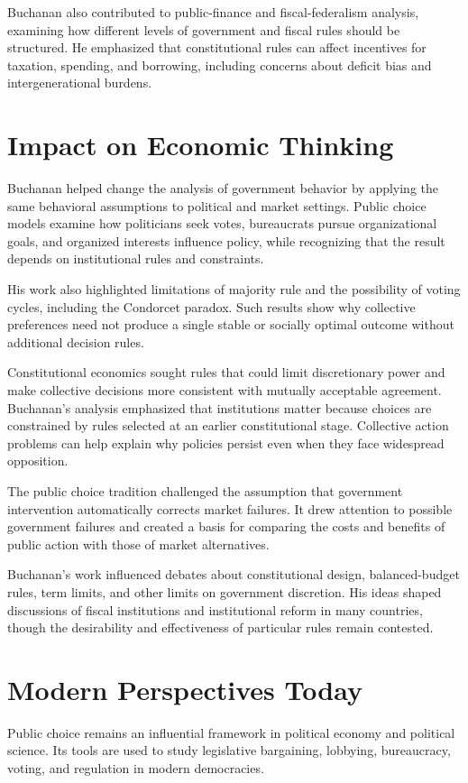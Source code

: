 Buchanan also contributed to public-finance and fiscal-federalism analysis,
examining how different levels of government and fiscal rules should be
structured. He emphasized that constitutional rules can affect incentives for
taxation, spending, and borrowing, including concerns about deficit bias and
intergenerational burdens.

\section{Impact on Economic Thinking}
Buchanan helped change the analysis of government behavior by applying the
same behavioral assumptions to political and market settings. Public choice
models examine how politicians seek votes, bureaucrats pursue organizational
goals, and organized interests influence policy, while recognizing that the
result depends on institutional rules and constraints.

His work also highlighted limitations of majority rule and the possibility of
voting cycles, including the Condorcet paradox. Such results show why
collective preferences need not produce a single stable or socially optimal
outcome without additional decision rules.

Constitutional economics sought rules that could limit discretionary power and
make collective decisions more consistent with mutually acceptable agreement.
Buchanan's analysis emphasized that institutions matter because choices are
constrained by rules selected at an earlier constitutional stage. Collective
action problems can help explain why policies persist even when they face
widespread opposition.

The public choice tradition challenged the assumption that government
intervention automatically corrects market failures. It drew attention to
possible government failures and created a basis for comparing the costs and
benefits of public action with those of market alternatives.

Buchanan's work influenced debates about constitutional design, balanced-budget
rules, term limits, and other limits on government discretion. His ideas
shaped discussions of fiscal institutions and institutional reform in many
countries, though the desirability and effectiveness of particular rules
remain contested.

\section{Modern Perspectives Today}
Public choice remains an influential framework in political economy and
political science. Its tools are used to study legislative bargaining,
lobbying, bureaucracy, voting, and regulation in modern democracies.

